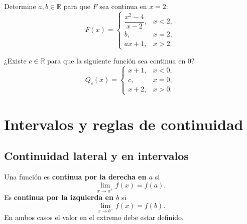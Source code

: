 \documentclass[10pt,a5paper]{article}
\newif\ifmostrarSoluciones
\begin{document}
\begin{ejemplo}
Determine $a,b\in\mathbb{R}$ para que $F$ sea continua en $x=2$:
\[
  F(x)=\begin{cases}
    \dfrac{x^2-4}{x-2},&x<2,\\[1mm]
    b,&x=2,\\
    ax+1,&x>2.
  \end{cases}
\]
\end{ejemplo}
\ifmostrarSoluciones
\begin{solucion}
Para $x<2$, se puede simplificar $F(x)=x+2$. Así,
\[
  \lim_{x\to2^-}F(x)=4,\qquad
  \lim_{x\to2^+}F(x)=2a+1,\qquad F(2)=b.
\]
La continuidad exige $4=b=2a+1$, de donde
\[
  a=\frac32,\qquad b=4.
\]
Con estos valores coinciden los límites laterales y el valor de la función.
\end{solucion}
\else\vspace{24mm}\fi

\begin{ejemplo}
¿Existe $c\in\mathbb{R}$ para que la siguiente función sea continua en $0$?
\[
  Q_c(x)=\begin{cases}x+1,&x<0,\\c,&x=0,\\x+2,&x>0.\end{cases}
\]
\end{ejemplo}
\ifmostrarSoluciones
\begin{solucion}
Los límites laterales son $1$ y $2$, independientemente de $c$. No existe un límite bilateral, por lo que ningún valor de $c$ produce continuidad. Igualar solamente uno de los límites a $Q_c(0)$ no basta.
\end{solucion}
\else\vspace{14mm}\fi

\section*{Intervalos y reglas de continuidad}
\subsection*{Continuidad lateral y en intervalos}

\begin{definicion}
Una función es \textbf{continua por la derecha en $a$} si
\[
  \lim_{x\to a^+}f(x)=f(a).
\]
Es \textbf{continua por la izquierda en $b$} si
\[
  \lim_{x\to b^-}f(x)=f(b).
\]
En ambos casos el valor en el extremo debe estar definido.
\end{definicion}
\end{document}
